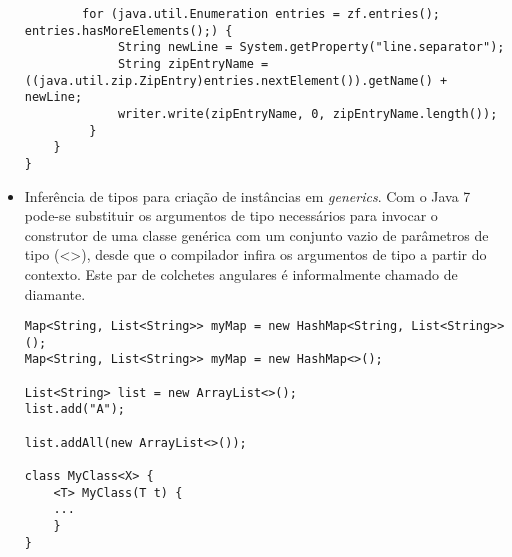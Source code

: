 \begin{itemize}
\begin{lstlisting}
		for (java.util.Enumeration entries = zf.entries(); entries.hasMoreElements();) {
			 String newLine = System.getProperty("line.separator");
			 String zipEntryName = ((java.util.zip.ZipEntry)entries.nextElement()).getName() + newLine;
			 writer.write(zipEntryName, 0, zipEntryName.length());
		 }
	}
}

\end{lstlisting}
		  
		  \clearpage
		  \item Inferência de tipos para criação de instâncias em {\it generics}\cite{OracleGenerics}\cite{Bracha:1998:MFS:286942.286957}\cite{Parnin:2011:JGA:1985441.1985446}. Com o Java 7 pode-se substituir os argumentos de tipo necessários para invocar o construtor de uma classe genérica com um conjunto vazio de parâmetros de tipo (<>), desde que o compilador infira os argumentos de tipo a partir do contexto. Este par de colchetes angulares é informalmente chamado de diamante.
  
  

\begin{lstlisting}
Map<String, List<String>> myMap = new HashMap<String, List<String>>();
Map<String, List<String>> myMap = new HashMap<>();
	
List<String> list = new ArrayList<>();
list.add("A");

list.addAll(new ArrayList<>());
	
class MyClass<X> {
	<T> MyClass(T t) {
	...
	}
}
\end{lstlisting}
	 
	  \end{itemize}
	  
	  
